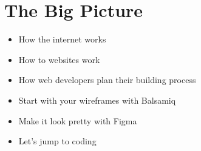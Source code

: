 \part{The Big Picture}\label{part:the-big-picture}

\begin{itemize}
    \item How the internet works
    \item How to websites work
    \item How web developers plan their building process
    \item Start with your wireframes with Balsamiq
    \item Make it look pretty with Figma
    \item Let's jump to coding
\end{itemize}
